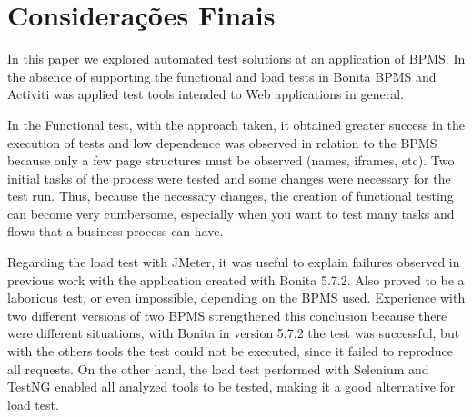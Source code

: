 \documentclass[runningheads,a4paper]{llncs}
\begin{document}
\section{Considerações Finais}\label{s:conclu}

In this paper we explored automated test solutions at an application of BPMS. In the absence of supporting the functional and load tests in Bonita BPMS and Activiti was applied test tools intended to Web applications in general.

In the Functional test, with the approach taken, it obtained greater success in the execution of tests and low dependence was observed in relation to the BPMS because only a few page structures must be observed (names, iframes, etc). Two initial tasks of the process  were tested and some changes were necessary for the test run. Thus, because the necessary changes, the creation of functional testing can become very cumbersome, especially when you want to test many tasks and flows that a business process can have.

Regarding the load test with JMeter, it was useful to explain failures observed in previous work with the application created with Bonita 5.7.2. Also proved to be a laborious test, or even impossible, depending on the BPMS used. Experience with two different versions of two BPMS strengthened this conclusion because there were different situations, with Bonita in version 5.7.2 the test was successful, but with the others tools the test could not be executed, since it failed to reproduce all requests. On the other hand, the load test performed with Selenium and TestNG enabled all analyzed tools to be tested, making it a good alternative for load test.

\end{document}
